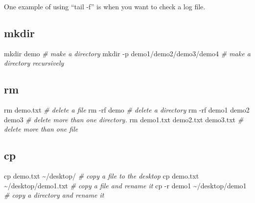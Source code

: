 \documentclass[
]{book}
\newenvironment{Shaded}{\begin{snugshade}}{\end{snugshade}}
\newcommand{\AttributeTok}[1]{\textcolor[rgb]{0.77,0.63,0.00}{#1}}
\newcommand{\CommentTok}[1]{\textcolor[rgb]{0.56,0.35,0.01}{\textit{#1}}}
\newcommand{\FunctionTok}[1]{\textcolor[rgb]{0.00,0.00,0.00}{#1}}
\newcommand{\NormalTok}[1]{#1}
\begin{document}
One example of using ``tail -f'' is when you want to check a log file.

\hypertarget{mkdir}{%
\subsection*{mkdir}\label{mkdir}}

\begin{Shaded}
\begin{Highlighting}[]
\FunctionTok{mkdir}\NormalTok{ demo }\CommentTok{\# make a directory}
\FunctionTok{mkdir} \AttributeTok{{-}p}\NormalTok{ demo1/demo2/demo3/demo4 }\CommentTok{\# make a directory recursively}
\end{Highlighting}
\end{Shaded}

\hypertarget{rm}{%
\subsection*{rm}\label{rm}}

\begin{Shaded}
\begin{Highlighting}[]
\FunctionTok{rm}\NormalTok{ demo.txt }\CommentTok{\# delete a file}
\FunctionTok{rm} \AttributeTok{{-}rf}\NormalTok{ demo }\CommentTok{\# delete a directory  }
\FunctionTok{rm} \AttributeTok{{-}rf}\NormalTok{ demo1 demo2 demo3 }\CommentTok{\# delete more than one directory.}
\FunctionTok{rm}\NormalTok{ demo1.txt demo2.txt demo3.txt }\CommentTok{\# delete more than one file}
\end{Highlighting}
\end{Shaded}

\hypertarget{cp}{%
\subsection*{cp}\label{cp}}

\begin{Shaded}
\begin{Highlighting}[]
\FunctionTok{cp}\NormalTok{ demo.txt \textasciitilde{}/desktop/ }\CommentTok{\# copy a file to the desktop }
\FunctionTok{cp}\NormalTok{ demo.txt \textasciitilde{}/desktop/demo1.txt }\CommentTok{\# copy a file and rename it}
\FunctionTok{cp} \AttributeTok{{-}r}\NormalTok{ demo1 \textasciitilde{}/desktop/demo1 }\CommentTok{\# copy a directory and rename it}
\end{Highlighting}
\end{Shaded}
\end{document}
